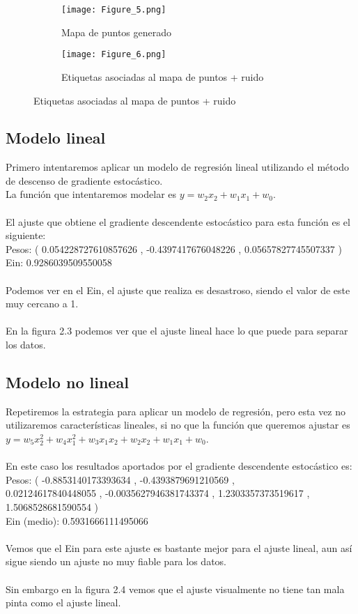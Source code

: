\begin{figure}[h]
   \centering
   \begin{subfigure}[b]{0.45\textwidth}
      \texttt{[image: Figure\_5.png]}
      \caption{Mapa de puntos generado}
   \end{subfigure}
   \hfill
   \begin{subfigure}[b]{0.45\textwidth}
      \texttt{[image: Figure\_6.png]}
      \caption{Etiquetas asociadas al mapa de puntos + ruido}
   \end{subfigure}
\end{figure}


\subsection{Modelo lineal}
Primero intentaremos aplicar un modelo de regresión lineal utilizando el método de descenso de gradiente estocástico.\\
La función que intentaremos modelar es $ y = w_{2}x_{2} + w_{1}x_{1} + w_{0} $.\\
\\
El ajuste que obtiene el gradiente descendente estocástico para esta función es el siguiente:\\
Pesos: ( 0.054228727610857626 ,  -0.4397417676048226 ,  0.05657827745507337 )\\
Ein:  0.9286039509550058\\
\\
Podemos ver en el Ein, el ajuste que realiza es desastroso, siendo el valor de este muy cercano a 1.\\
\\
En la figura 2.3 podemos ver que el ajuste lineal hace lo que puede para separar los datos.

\subsection{Modelo no lineal}
Repetiremos la estrategia para aplicar un modelo de regresión, pero esta vez no utilizaremos características lineales, si no que la función que queremos ajustar es $ y = w_{5}x_{2}^{2} + w_{4}x_{1}^{2} + w_{3}x_{1}x_{2} + w_{2}x_{2} + w_{1}x_{1} + w_{0} $.\\
\\
En este caso los resultados aportados por el gradiente descendente estocástico es:\\
Pesos: ( -0.8853140173393634 ,  -0.4393879691210569 ,  \\
0.02124617840448055 ,  -0.0035627946381743374 ,  1.2303357373519617 ,  1.5068528681590554 )\\
Ein (medio):  0.5931666111495066\\
\\
Vemos que el Ein para este ajuste es bastante mejor para el ajuste lineal, aun así sigue siendo un ajuste no muy fiable para los datos.\\
\\
Sin embargo en la figura 2.4 vemos que el ajuste visualmente no tiene tan mala pinta como el ajuste lineal.

